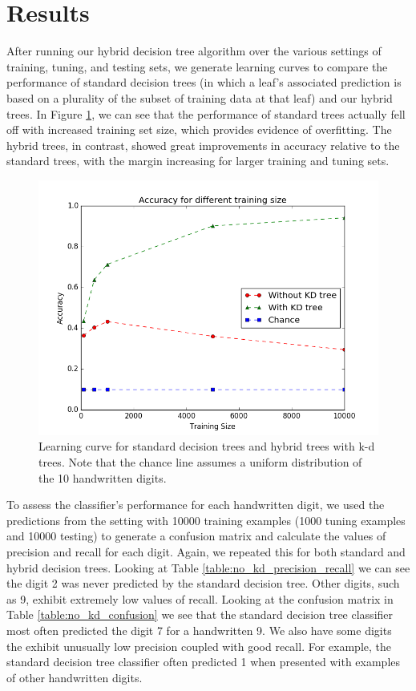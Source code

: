 \section{Results}
After running our hybrid decision tree algorithm over the various settings of training, tuning, and testing sets, we generate learning curves to compare the performance of standard decision trees (in which a leaf's associated prediction is based on a plurality of the subset of training data at that leaf) and our hybrid trees.  In Figure \ref{fig:learn_curve}, we can see that the performance of standard trees actually fell off with increased training set size, which provides evidence of overfitting. The hybrid trees, in contrast, showed great improvements in accuracy relative to the standard trees, with the margin increasing for larger training and tuning sets.

\begin{figure}
	\includegraphics[width=\linewidth]{Figures/learning_curve.png}
	\caption{Learning curve for standard decision trees and hybrid trees with k-d trees.  Note that the chance line assumes a uniform distribution of the 10 handwritten digits.}
	\label{fig:learn_curve}
\end{figure}

To assess the classifier's performance for each handwritten digit, we used the predictions from the setting with 10000 training examples (1000 tuning examples and 10000 testing) to generate a confusion matrix and calculate the values of precision and recall for each digit.  Again, we repeated this for both standard and hybrid decision trees.  Looking at Table \ref{table:no_kd_precision_recall} we can see the digit 2 was never predicted by the standard decision tree.  Other digits, such as 9, exhibit extremely low values of recall. Looking at the confusion matrix in Table \ref{table:no_kd_confusion} we see that the standard decision tree classifier most often predicted the digit 7 for a handwritten 9.  We also have some digits the exhibit unusually low precision coupled with good recall.  For example, the standard decision tree classifier often predicted 1 when presented with examples of other handwritten digits.

